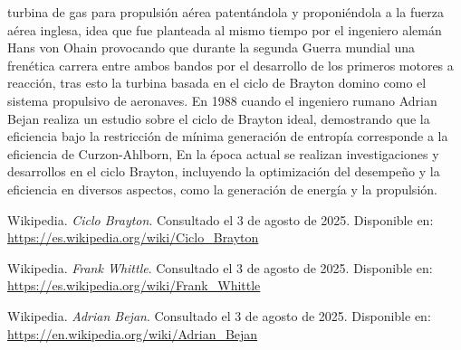\documentclass{article}
\begin{document}
turbina de gas para propulsión aérea patentándola y proponiéndola a la fuerza
aérea inglesa, idea que fue planteada al mismo tiempo por el ingeniero alemán Hans von Ohain
provocando que durante la segunda Guerra mundial una frenética carrera entre ambos bandos
por el desarrollo de los primeros motores a reacción, tras esto la turbina
basada en el ciclo de Brayton domino como el sistema propulsivo de aeronaves.
En 1988 cuando el ingeniero rumano
Adrian Bejan realiza un estudio sobre el ciclo de Brayton ideal, demostrando 
que la eficiencia bajo la restricción de mínima generación de entropía 
corresponde a la eficiencia de Curzon-Ahlborn,
En la época actual se realizan
investigaciones y desarrollos en el ciclo Brayton, incluyendo la optimización del 
desempeño y la eficiencia en diversos aspectos, como la generación de energía y 
la propulsión.
\begin{thebibliography}{3}

Wikipedia. \emph{Ciclo Brayton}. Consultado el 3 de agosto de 2025. Disponible en: \url{https://es.wikipedia.org/wiki/Ciclo_Brayton}

Wikipedia. \emph{Frank Whittle}. Consultado el 3 de agosto de 2025. Disponible en: \url{https://es.wikipedia.org/wiki/Frank_Whittle}

Wikipedia. \emph{Adrian Bejan}. Consultado el 3 de agosto de 2025. Disponible en: \url{https://en.wikipedia.org/wiki/Adrian_Bejan}

\end{thebibliography}
\end{document}
